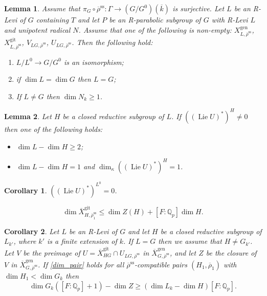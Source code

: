 \documentclass[10pt,a4paper]{amsart}
\newtheorem{lem}{Lemma}
\newtheorem{cor}{Corollary}
\DeclareMathOperator{\Lie}{Lie}
\newcommand{\Qp}{\mathbb {Q}_p}
\newcommand{\Xbar}{\overline{X}}
\newcommand{\gen}{\mathrm{gen}}
\newcommand{\gps}{\mathrm{git}}
\newcommand{\kbar}{\overline{k}}
\newcommand{\rhobar}{\overline{\rho}}
\newcommand{\rhobarss}{\rhobar^{\mathrm{ss}}}
\begin{document}
 \begin{lem}\label{V_LG_maxdim} Assume that $\pi_G\circ \rhobarss: \Gamma \rightarrow (G/G^0)(\kbar)$ is surjective. 
Let $L$ be an R-Levi of $G$ containing $T$ and let $P$ be an R-parabolic subgroup of $G$ with 
R-Levi $L$ and unipotent radical $N$. 
Assume that one of the following is non-empty: 
$X^{\gen}_{L, \rhobarss}$, $X^{\gps}_{L, \rhobarss}$, $V_{LG, \rhobarss}$, $U_{LG, \rhobarss}$. 
Then the following hold:
\begin{enumerate} 
\item $L/L^0\rightarrow G/G^0$ is an isomorphism;
\item if $\dim L=\dim G$ then $L=G$;
\item If $L\neq G$ then $\dim  N_k\ge 1$.
\end{enumerate} 
\end{lem}

 \begin{lem}\label{HL} Let $H$ be a closed reductive subgroup of $L$.
 If $((\Lie U)^*)^H\neq 0$ then one of the following holds:
 \begin{itemize}
 \item[(i)] $\dim L - \dim H \ge 2$;
 \item[(ii)] $\dim L -\dim H =1$ and $\dim_{\kappa} ((\Lie U)^*)^H=1$.
 \end{itemize}
 \end{lem}

 \begin{cor}\label{Lzero} $((\Lie U)^*)^{L^0}=0$. 
 \end{cor}

\begin{equation}\label{dim_pair} 
\dim \Xbar^{\gps}_{H, \rhobar_1^{\mathrm{ss}}} \le \dim Z(H) + [F:\Qp] \dim H \tag{DIM}.
\end{equation} 

\begin{cor}\label{bound_1} Let $L$ be an R-Levi of $G$ and let $H$ be a closed reductive subgroup of $L_{k'}$, where 
$k'$ is a finite extension of $k$. If $L=G$ then we assume that $H\neq G_{k'}$. 
Let $V$ be the preimage of $U=\Xbar^{\gps}_{HG}\cap U_{LG, \rhobarss}$ in $\Xbar^{\gen}_{G, \rhobarss}$, and let $Z$ be the closure of $V$ in $\Xbar^{\gen}_{G, \rhobarss}$. 
If \eqref{dim_pair} holds for all $\rhobarss$-compatible pairs $(H_1, \rhobar_1)$ with $\dim H_1< \dim G_k$ then
$$\dim G_k ([F:\Qp]+1) - \dim Z\ge (\dim L_k - \dim H)[F:\Qp].$$
\end{cor}
\end{document}
